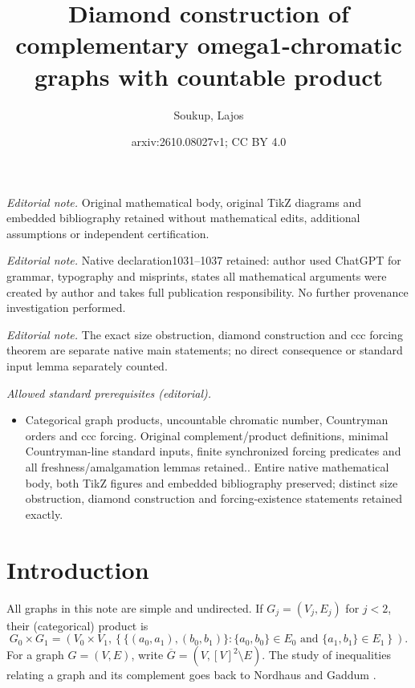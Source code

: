 \documentclass[10pt,a4paper]{amsart}
\title{Diamond construction of complementary omega1-chromatic graphs with countable product}
\author{Soukup, Lajos}
\date{arxiv:2610.08027v1; CC BY 4.0}
\numberwithin{equation}{section}
\theoremstyle{definition}
\theoremstyle{remark}
\begin{document}
\maketitle
\noindent\textit{Editorial note.} Original mathematical body, original TikZ diagrams and embedded bibliography retained without mathematical edits, additional assumptions or independent certification.\par\medskip
\noindent\textit{Editorial note.} Native declaration1031--1037 retained: author used ChatGPT for grammar, typography and misprints, states all mathematical arguments were created by author and takes full publication responsibility. No further provenance investigation performed.\par\medskip
\noindent\textit{Editorial note.} The exact size obstruction, diamond construction and ccc forcing theorem are separate native main statements; no direct consequence or standard input lemma separately counted.\par\medskip
\noindent\textit{Allowed standard prerequisites (editorial).}\begin{itemize}
\item Categorical graph products, uncountable chromatic number, Countryman orders and ccc forcing. Original complement/product definitions, minimal Countryman-line standard inputs, finite synchronized forcing predicates and all freshness/amalgamation lemmas retained.. Entire native mathematical body, both TikZ figures and embedded bibliography preserved; distinct size obstruction, diamond construction and forcing-existence statements retained exactly.
\end{itemize}\medskip
\section{Introduction}

All graphs in this note are simple and undirected.  If
$G_j=(V_j,E_j)$ for $j<2$, their (categorical) product is
\begin{displaymath}
 G_0\times G_1=
 \left(V_0\times V_1,
 \left\{\{(a_0,a_1),(b_0,b_1)\}:
       \{a_0,b_0\}\in E_0\text{ and }\{a_1,b_1\}\in E_1
 \right\}\right).
\end{displaymath}
For a graph $G=(V,E)$, write
$\overline G=(V,[V]^2\setminus E)$.  The study of inequalities relating
a graph and its complement goes back to Nordhaus and Gaddum
\cite{NordhausGaddum1956}.
\end{document}
